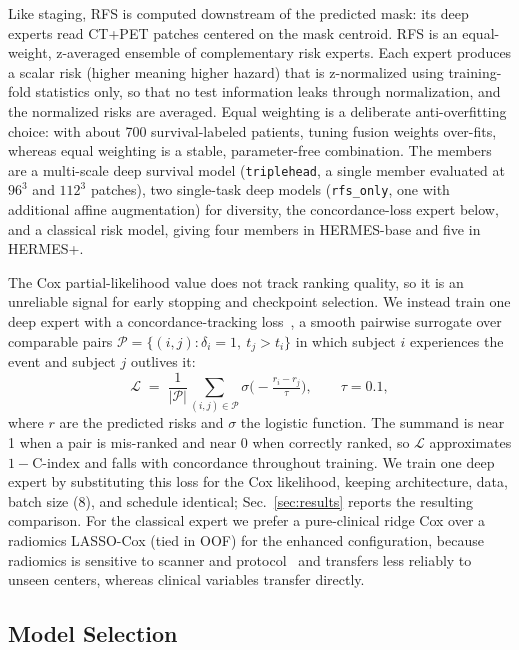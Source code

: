 \documentclass[runningheads]{llncs}
\begin{document}
Like staging, RFS is computed downstream of the predicted mask: its deep experts read CT+PET patches centered on the mask centroid. RFS is an equal-weight, z-averaged ensemble of complementary risk experts. Each expert produces a scalar risk (higher meaning higher hazard) that is z-normalized using training-fold statistics only, so that no test information leaks through normalization, and the normalized risks are averaged. Equal weighting is a deliberate anti-overfitting choice: with about 700 survival-labeled patients, tuning fusion weights over-fits, whereas equal weighting is a stable, parameter-free combination. The members are a multi-scale deep survival model (\texttt{triplehead}, a single member evaluated at $96^3$ and $112^3$ patches), two single-task deep models (\texttt{rfs\_only}, one with additional affine augmentation) for diversity, the concordance-loss expert below, and a classical risk model, giving four members in HERMES-base and five in HERMES+.

The Cox partial-likelihood value does not track ranking quality, so it is an unreliable signal for early stopping and checkpoint selection. We instead train one deep expert with a concordance-tracking loss~\cite{ref14}, a smooth pairwise surrogate over comparable pairs $\mathcal{P}=\{(i,j):\delta_i=1,\ t_j>t_i\}$ in which subject $i$ experiences the event and subject $j$ outlives it:
\begin{equation}
\mathcal{L} \;=\; \frac{1}{|\mathcal{P}|}\sum_{(i,j)\in\mathcal{P}} \sigma\!\Big(-\tfrac{r_i - r_j}{\tau}\Big), \qquad \tau = 0.1,
\end{equation}
where $r$ are the predicted risks and $\sigma$ the logistic function. The summand is near 1 when a pair is mis-ranked and near 0 when correctly ranked, so $\mathcal{L}$ approximates $1-\text{C-index}$ and falls with concordance throughout training. We train one deep expert by substituting this loss for the Cox likelihood, keeping architecture, data, batch size (8), and schedule identical; Sec.~\ref{sec:results} reports the resulting comparison. For the classical expert we prefer a pure-clinical ridge Cox over a radiomics LASSO-Cox (tied in OOF) for the enhanced configuration, because radiomics is sensitive to scanner and protocol~\cite{ref20,ref21} and transfers less reliably to unseen centers, whereas clinical variables transfer directly.
\subsection{Model Selection}
\label{sec:selection}
\end{document}

